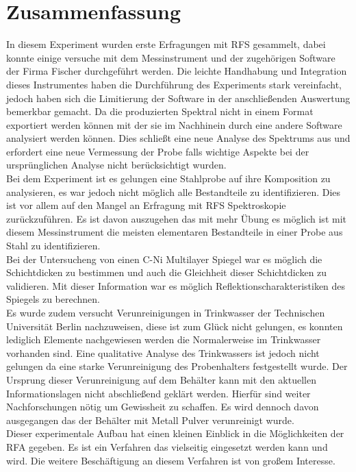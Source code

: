 \section{Zusammenfassung}

In diesem Experiment wurden erste Erfragungen mit RFS gesammelt, dabei konnte einige versuche mit dem Messinstrument und der zugehörigen Software der Firma Fischer durchgeführt werden. Die leichte Handhabung und Integration dieses Instrumentes haben die Durchführung des Experiments stark vereinfacht, jedoch haben sich die Limitierung der Software in der anschließenden Auswertung bemerkbar gemacht. Da die produzierten Spektral nicht in einem Format exportiert werden können mit der sie im Nachhinein durch eine andere Software analysiert werden können. Dies schließt eine neue Analyse des Spektrums aus und erfordert eine neue Vermessung der Probe falls wichtige Aspekte bei der ursprünglichen Analyse nicht berücksichtigt wurden. \\
Bei dem Experiment ist es gelungen eine Stahlprobe auf ihre Komposition zu analysieren, es war jedoch nicht möglich alle Bestandteile zu identifizieren. Dies ist vor allem auf den Mangel an Erfragung mit RFS Spektroskopie zurückzuführen. Es ist davon auszugehen das mit mehr Übung es möglich ist mit diesem Messinstrument die meisten elementaren Bestandteile in einer Probe aus Stahl zu identifizieren.  \\
Bei der Untersucheng von einen C-Ni Multilayer Spiegel war es möglich die Schichtdicken zu bestimmen und auch die Gleichheit dieser Schichtdicken zu validieren. Mit dieser Information war es möglich Reflektionscharakteristiken des Spiegels zu berechnen. \\
Es wurde zudem versucht Verunreinigungen in Trinkwasser der Technischen Universität Berlin nachzuweisen, diese ist zum Glück nicht gelungen, es konnten lediglich Elemente nachgewiesen werden die Normalerweise im Trinkwasser vorhanden sind. Eine qualitative Analyse des Trinkwassers ist jedoch nicht gelungen da eine starke Verunreinigung des Probenhalters festgestellt wurde. Der Ursprung dieser Verunreinigung auf dem Behälter kann mit den aktuellen Informationslagen nicht abschließend geklärt werden. Hierfür sind weiter Nachforschungen nötig um Gewissheit zu schaffen. Es wird dennoch davon ausgegangen das der Behälter mit Metall Pulver verunreinigt wurde.\\
Dieser experimentale Aufbau hat einen kleinen Einblick in die Möglichkeiten der RFA gegeben. Es ist ein Verfahren das vielseitig eingesetzt werden kann und wird. Die weitere Beschäftigung an diesem Verfahren ist von großem Interesse.
